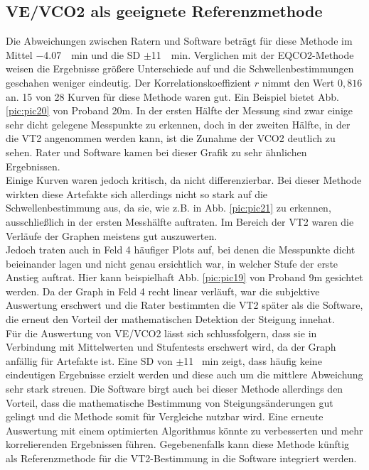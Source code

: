 \subsection{\gls{VE}/\gls{VCO2} als geeignete Referenzmethode}
%
Die Abweichungen zwischen Ratern und Software beträgt für diese Methode im Mittel \SI{-4,07}{\per\minute} und die \gls{SD} $\pm$\SI{11}{\per\minute}. Verglichen mit der \gls{EQCO2}-Methode weisen die Ergebnisse größere Unterschiede auf und die Schwellenbestimmungen geschahen weniger eindeutig. Der Korrelationskoeffizient $r$ nimmt den Wert $0,816$ an. 15 von 28 Kurven für diese Methode waren gut. Ein Beispiel bietet Abb. \ref{pic:pic20} von Proband 20m. In der ersten Hälfte der Messung sind zwar einige sehr dicht gelegene Messpunkte zu erkennen, doch in der zweiten Hälfte, in der die VT2 angenommen werden kann, ist die Zunahme der \gls{VCO2} deutlich zu sehen. Rater und Software kamen bei dieser Grafik zu sehr ähnlichen Ergebnissen.\\
Einige Kurven waren jedoch kritisch, da nicht differenzierbar. Bei dieser Methode wirkten diese Artefakte sich allerdings nicht so stark auf die Schwellenbestimmung aus, da sie, wie z.B. in Abb. \ref{pic:pic21} zu erkennen, ausschließlich in der ersten Messhälfte auftraten. Im Bereich der VT2 waren die Verläufe der Graphen meistens gut auszuwerten.\\
Jedoch traten auch in Feld 4 häufiger Plots auf, bei denen die Messpunkte dicht beieinander lagen und nicht genau ersichtlich war, in welcher Stufe der erste Anstieg auftrat. Hier kann beispielhaft Abb. \ref{pic:pic19} von Proband 9m gesichtet werden. Da der Graph in Feld 4 recht linear verläuft, war die subjektive Auswertung erschwert und die Rater bestimmten die VT2 später als die Software, die erneut den Vorteil der mathematischen Detektion der Steigung innehat.\\
Für die Auswertung von \gls{VE}/\gls{VCO2} lässt sich schlussfolgern, dass sie in Verbindung mit Mittelwerten und Stufentests erschwert wird, da der Graph anfällig für Artefakte ist. Eine \gls{SD} von $\pm$11 \si{\per\minute} zeigt, dass häufig keine eindeutigen Ergebnisse erzielt werden und diese auch um die mittlere Abweichung sehr stark streuen. Die Software birgt auch bei dieser Methode allerdings den Vorteil, dass die mathematische Bestimmung von Steigungsänderungen gut gelingt und die Methode somit für Vergleiche nutzbar wird. Eine erneute Auswertung mit einem optimierten Algorithmus könnte zu verbesserten und mehr korrelierenden Ergebnissen führen. Gegebenenfalls kann diese Methode künftig als Referenzmethode für die VT2-Bestimmung in die Software integriert werden.
%
